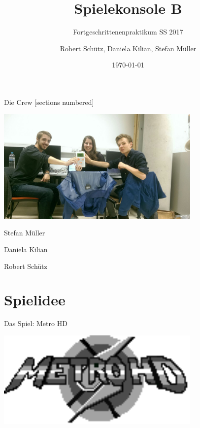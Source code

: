 \documentclass[fleqn]{beamer}
\title{Spielekonsole B}
\date{\today}
\author{Robert Schütz, Daniela Kilian, Stefan Müller}
\subtitle{Fortgeschrittenenpraktikum SS 2017}
\begin{document}
	\maketitle
	
	\begin{frame}{Die Crew}
		[sections numbered]
		 \begin{center}
            \includegraphics[width=10cm]{Bilder/wir.jpg}
        \end{center}
        \begin{minipage}{0.3\textwidth}
            \centering Stefan Müller
        \end{minipage}
        \begin{minipage}{0.3\textwidth}
            \centering Daniela Kilian
        \end{minipage}
        \begin{minipage}{0.3\textwidth}
            \centering Robert Schütz
        \end{minipage}           
	\end{frame}
    \section{Spielidee}
    \begin{frame}{Das Spiel: Metro HD}
        \begin{center}
            \includegraphics[width=10cm]{Bilder/splash.png}
        \end{center}
    \end{frame}
\end{document}
